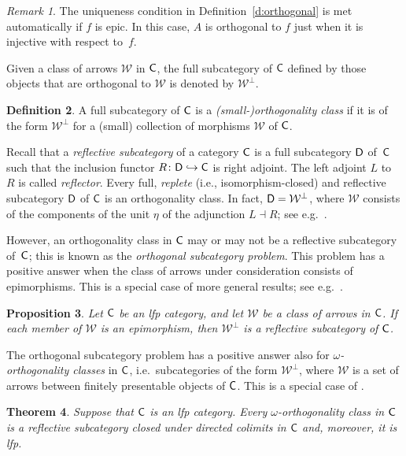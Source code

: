 \documentclass[a4paper,10pt,reqno]{amsart}
\newtheorem{theorem}{Theorem}[section]
\newtheorem{proposition}[theorem]{Proposition}
\theoremstyle{definition}
\newtheorem{definition}[theorem]{Definition}
\theoremstyle{remark}
\newtheorem{remark}[theorem]{Remark}
\newcommand{\cat}{{\sf C}}								%
\newcommand{\catt}{{\sf D}}								%
\newcommand{\ar}[1]{\mathcal{#1}}							%
\newcommand{\into}{\hookrightarrow}						%
\newcommand{\ort}[1]{{#1}^{\perp}}						%
\begin{document}
\begin{remark}
The uniqueness condition in Definition~\ref{d:orthogonal} is met automatically if $f$ is epic. In this case, $A$ is orthogonal to $f$ just when it is injective with respect to~$f$.
\end{remark}

Given a class of arrows $\ar{W}$ in $\cat$, the full subcategory of $\cat$ defined by those objects that are orthogonal to $\ar{W}$ is denoted by $\ort{\ar{W}}$. 

\begin{definition}
A full subcategory of $\cat$ is a \emph{(small-)orthogonality class} if it is of the form $\ort{\ar{W}}$ for a (small) collection of morphisms $\ar{W}$ of $\cat$.
\end{definition}

Recall that a \emph{reflective subcategory} of a category $\cat$ is a full subcategory $\catt$ of~$\cat$ such that the inclusion functor $R\colon \catt\into\cat$ is right adjoint. The left adjoint $L$ to~$R$ is called \emph{reflector}.
%
Every full, \emph{replete} (i.e., isomorphism-closed) and reflective subcategory $\catt$ of $\cat$ is an orthogonality class. In fact, $\catt=\ort{\ar{W}}$, where $\ar{W}$ consists of the components of the unit $\eta$ of the adjunction $L\dashv R$; see e.g.\ \cite[Examples~1.33(1)]{ar94book}. 

However, an orthogonality class in $\cat$ may or may not be a reflective subcategory of~$\cat$; this is known as the \emph{orthogonal subcategory problem}.
%
This problem has a positive answer when the class of arrows under consideration consists of epimorphisms. This is a special case of more general results; see e.g.~\cite{FK1972,AHS2009}.

\begin{proposition}\label{p:localise-epis}
Let $\cat$ be an lfp category, and let $\ar{W}$ be a class of arrows in $\cat$. If each member of $\ar{W}$ is an epimorphism, then $\ort{\ar{W}}$ is a reflective subcategory of $\cat$. 
\end{proposition}

The orthogonal subcategory problem has a positive answer also for \emph{$\omega$-orthogonality classes} in $\cat$, i.e.\ subcategories of the form $\ort{\ar{W}}$, where $\ar{W}$ is a set of arrows between finitely presentable objects of $\cat$. This is a special case of \cite[Theorem~1.39]{ar94book}.

\begin{theorem}\label{orthog-reflective}
Suppose that $\cat$ is an lfp category. Every $\omega$-orthogonality class in $\cat$ is a reflective subcategory closed under directed colimits in $\cat$ and, moreover, it is lfp.
\end{theorem}
\end{document}
